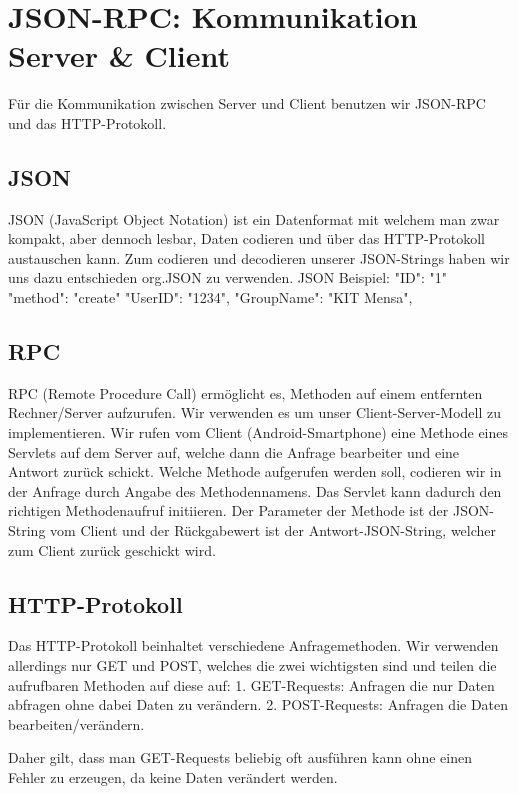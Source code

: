 
\section{JSON-RPC: Kommunikation Server \& Client}
Für die Kommunikation zwischen Server und Client benutzen wir JSON-RPC und das HTTP-Protokoll.

\subsection{JSON}
JSON (JavaScript Object Notation) ist ein Datenformat mit welchem man zwar kompakt, aber dennoch lesbar, Daten codieren und über das HTTP-Protokoll austauschen kann.
Zum codieren und decodieren unserer JSON-Strings haben wir uns dazu entschieden org.JSON zu verwenden.
JSON Beispiel:
{
  "ID": "1"
  "method": "create"	
  "UserID": "1234",
  "GroupName": "KIT Mensa",
}

\subsection{RPC}
RPC (Remote Procedure Call) ermöglicht es, Methoden auf einem entfernten Rechner/Server aufzurufen. Wir verwenden es um unser Client-Server-Modell zu implementieren.
Wir rufen vom Client (Android-Smartphone) eine Methode eines Servlets auf dem Server auf, welche dann die Anfrage bearbeiter und eine Antwort zurück schickt.
Welche Methode aufgerufen werden soll, codieren wir in der Anfrage durch Angabe des Methodennamens. Das Servlet kann dadurch den richtigen Methodenaufruf initiieren.
Der Parameter der Methode ist der JSON-String vom Client und der Rückgabewert ist der Antwort-JSON-String, welcher zum Client zurück geschickt wird.


\subsection{HTTP-Protokoll}
Das HTTP-Protokoll beinhaltet verschiedene Anfragemethoden.
Wir verwenden allerdings nur GET und POST, welches die zwei wichtigsten sind und teilen die aufrufbaren Methoden auf diese auf:
1. GET-Requests: Anfragen die nur Daten abfragen ohne dabei Daten zu verändern.
2. POST-Requests: Anfragen die Daten bearbeiten/verändern.

Daher gilt, dass man GET-Requests beliebig oft ausführen kann ohne einen Fehler zu erzeugen, da keine Daten verändert werden.

\hypertarget{controler.serverConnection}{}
\hypertarget{ServerConnection}{}
